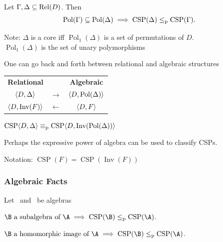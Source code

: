 \documentclass[12pt,xcolor=dvipsnames,handout
   ]{beamer}
\DeclareMathOperator{\Rel}{Rel}
\newcommand{\bigpause}{\pause\bigskip}
\DeclareMathOperator{\CSP}{CSP}
\DeclareMathOperator{\Pol}{Pol}
\DeclareMathOperator{\Inv}{Inv}
\renewcommand{\.}{\cdot}
\newcommand{\reduc}{\leq_{\text{\textnormal{p}}}}
\newcommand{\equivp}{\equiv_{\text{\textnormal{p}}}}
\let\origtextbf=\textbf
\renewcommand{\textbf}[1]{{\usebeamercolor[fg]{example text}%
     \origtextbf{#1}}}
\begin{document}
\begin{frame}
  \begin{theorem}
    Let $\Gamma, \Delta \sseq \Rel(D)$. Then
    \begin{equation*}
      \Pol(\Gamma) \sseq \Pol(\Delta) \implies \CSP(\Delta) \reduc
      \CSP(\Gamma). 
    \end{equation*}
  \end{theorem}

\pause
Note: $\Delta$ is a core iff $\Pol_1(\Delta)$ is a set of permutations of $D$.\\
$\Pol_1(\Delta)$ is the set of unary polymorphisms

\end{frame}

\begin{frame}
  One can go back and forth between relational and algebraic structures

  \begin{center}
    \begin{tabular}{ccc}
      \origtextbf{Relational} & &\origtextbf{Algebraic}  \\
      $\langle D,\Delta\rangle$ & $\longrightarrow$ & $\<D,\Pol(\Delta)\>$ \\[2pt]
      $\<D, \Inv(F)\>$ & $\longleftarrow$ &$\langle D,F\rangle$
    \end{tabular}
  \end{center}

  $\CSP\<D,\Delta\> \equivp \CSP\<D,\Inv(\Pol(\Delta))\>$

  \bigpause
  Perhaps the expressive power of algebra can be used to classify CSPs.

  Notation: $\CSP(F) = \CSP(\Inv(F))$
\end{frame}

\begin{frame}
  \frametitle{Algebraic Facts}

  Let \A\ and \B\ be algebras

  $\B \text{ a subalgebra of \A} \implies \CSP(\B) \reduc \CSP(\A)$.

  $\B \text{ a homomorphic image of \A}\implies \CSP(\B) \reduc
  \CSP(\A)$. 

\end{frame}
\end{document}
